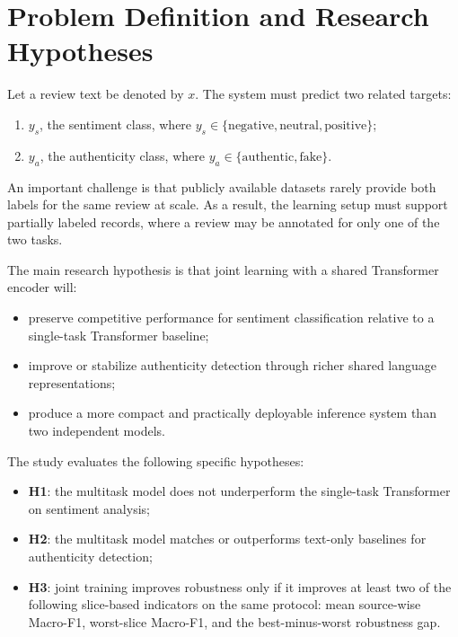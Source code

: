 \documentclass[12pt,a4paper]{article}
\begin{document}
\section{Problem Definition and Research Hypotheses}

Let a review text be denoted by $x$. The system must predict two related targets:

\begin{enumerate}[label=\arabic*.]
  \item $y_s$, the sentiment class, where $y_s \in \{\text{negative}, \text{neutral}, \text{positive}\}$;
  \item $y_a$, the authenticity class, where $y_a \in \{\text{authentic}, \text{fake}\}$.
\end{enumerate}

An important challenge is that publicly available datasets rarely provide both labels for the same review at scale. As a result, the learning setup must support partially labeled records, where a review may be annotated for only one of the two tasks.

The main research hypothesis is that joint learning with a shared Transformer encoder will:

\begin{itemize}[leftmargin=1.5cm]
  \item preserve competitive performance for sentiment classification relative to a single-task Transformer baseline;
  \item improve or stabilize authenticity detection through richer shared language representations;
  \item produce a more compact and practically deployable inference system than two independent models.
\end{itemize}

The study evaluates the following specific hypotheses:

\begin{itemize}[leftmargin=1.5cm]
  \item \textbf{H1}: the multitask model does not underperform the single-task Transformer on sentiment analysis;
  \item \textbf{H2}: the multitask model matches or outperforms text-only baselines for authenticity detection;
  \item \textbf{H3}: joint training improves robustness only if it improves at least two of the following slice-based indicators on the same protocol: mean source-wise Macro-F1, worst-slice Macro-F1, and the best-minus-worst robustness gap.
\end{itemize}
\end{document}
